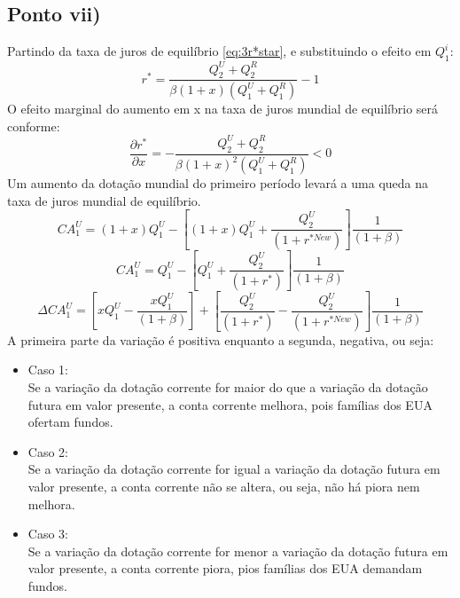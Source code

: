 \documentclass{article}
\begin{document}
\subsection*{Ponto vii)}
Partindo da taxa de juros de equilíbrio \eqref{eq:3r*star}, e substituindo o efeito em $Q_1^i$:
\begin{equation}
    r^*=    \frac{Q_2^{U}+Q_2^{R}}{\beta(1+x)(Q_1^U+Q_1^R)}-1
\end{equation}
O efeito marginal do aumento em x na taxa de juros mundial de equilíbrio será conforme:
\begin{equation}
    \frac{\partial r^*}{\partial x}=-\frac{Q_2^{U}+Q_2^{R}}{\beta(1+x)^2(Q_1^U+Q_1^R)}<0
\end{equation}
Um aumento da dotação mundial do primeiro período levará a uma queda na taxa de juros mundial de equilíbrio.
\begin{equation}
    CA_1^U = (1+x)Q_1^{U}-\left[(1+x)Q_1^{U}+\frac{Q_2^{U}}{(1+r^{*New})}\right]\frac{1}{(1+\beta)}
\end{equation}
\begin{equation}
    CA_1^U = Q_1^{U}-\left[Q_1^{U}+\frac{Q_2^{U}}{(1+r^*)}\right]\frac{1}{(1+\beta)}
\end{equation}
\begin{equation}
    \Delta CA_1^U = \left[x Q_1^{U}-\frac{x Q_1^{U}}{(1+\beta)}\right]+\left[\frac{Q_2^{U}}{(1+r^*)}-\frac{Q_2^{U}}{(1+r^{*New})}\right]\frac{1}{(1+\beta)}
\end{equation}
A primeira parte da variação é positiva enquanto a segunda, negativa, ou seja:
\begin{itemize}
    \item Caso 1:\\
    Se a variação da dotação corrente for maior do que a variação da dotação futura em valor presente, a conta corrente melhora, pois famílias dos EUA ofertam fundos.
    \item Caso 2:\\
    Se a variação da dotação corrente for igual a variação da dotação futura em valor presente, a conta corrente não se altera, ou seja, não há piora nem melhora.
    \item Caso 3:\\
    Se a variação da dotação corrente for menor a variação da dotação futura em valor presente, a conta corrente piora, pios famílias dos EUA demandam fundos.
\end{itemize}
\end{document}
